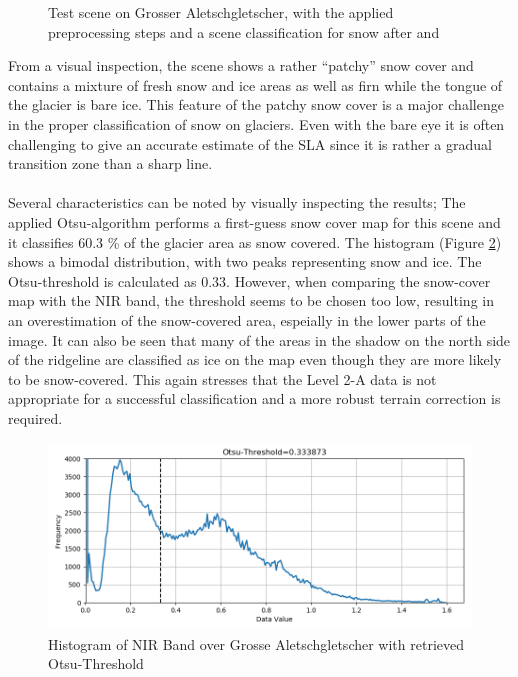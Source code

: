 \documentclass[12pt]{article}
\begin{document}
\begin{figure}[h]
        \caption{\small Test scene on Grosser Aletschgletscher, with the applied preprocessing steps and a scene classification for snow after \cite{Rastner2017} and \cite{Naegeli2017}} 
        \label{fig:aletsch}
\end{figure}
From a visual inspection, the scene shows a rather “patchy” snow cover and contains a mixture of fresh snow and ice areas as well as firn while the tongue of the glacier is bare ice. This feature of the patchy snow cover is a major challenge in the proper classification of snow on glaciers.  Even with the bare eye it is often challenging to give an accurate estimate of the SLA since it is rather a gradual transition zone than a sharp line. \\
\\
Several characteristics can be noted by visually inspecting the results;
The applied Otsu-algorithm performs a first-guess snow cover map for this scene and it classifies 
60.3 \% of the glacier area as snow covered.
The histogram (Figure \ref{fig:histogram}) shows a bimodal distribution, with two peaks representing snow and ice. The Otsu-threshold is calculated as 0.33. However, when comparing the snow-cover map with the NIR band, the threshold seems to be chosen too low, resulting in an overestimation of the snow-covered area, espeially in the lower parts of the image. It can also be seen that many of the areas in the shadow on the north side of the ridgeline are classified as ice on the map even though they are more likely to be snow-covered. This again stresses that the Level 2-A data is not appropriate for a successful classification and a more robust terrain correction is required. \\
\begin{figure}[h]
\centering
\includegraphics[width=\textwidth]{histogram_otsu_fiescher}
\caption{Histogram of NIR Band over Grosse Aletschgletscher with retrieved Otsu-Threshold}
\label{fig:histogram}
\end{figure}
\end{document}
